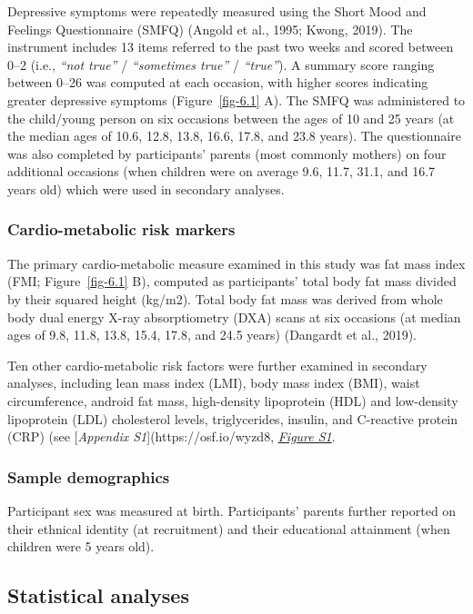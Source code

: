 \documentclass[
  letterpaper,
  DIV=11,
  numbers=noendperiod]{scrreport}
\begin{document}
Depressive symptoms were repeatedly measured using the Short Mood and
Feelings Questionnaire (SMFQ) (Angold et al., 1995; Kwong, 2019). The
instrument includes 13 items referred to the past two weeks and scored
between 0--2 (i.e., \emph{``not true''} / \emph{``sometimes true''} /
\emph{``true''}). A summary score ranging between 0--26 was computed at
each occasion, with higher scores indicating greater depressive symptoms
(Figure~\ref{fig-6.1} A). The SMFQ was administered to the child/young
person on six occasions between the ages of 10 and 25 years (at the
median ages of 10.6, 12.8, 13.8, 16.6, 17.8, and 23.8 years). The
questionnaire was also completed by participants' parents (most commonly
mothers) on four additional occasions (when children were on average
9.6, 11.7, 31.1, and 16.7 years old) which were used in secondary
analyses.

\subsubsection{Cardio-metabolic risk
markers}\label{cardio-metabolic-risk-markers}

The primary cardio-metabolic measure examined in this study was fat mass
index (FMI; Figure~\ref{fig-6.1} B), computed as participants' total
body fat mass divided by their squared height (kg/m2). Total body fat
mass was derived from whole body dual energy X-ray absorptiometry (DXA)
scans at six occasions (at median ages of 9.8, 11.8, 13.8, 15.4, 17.8,
and 24.5 years) (Dangardt et al., 2019).

Ten other cardio-metabolic risk factors were further examined in
secondary analyses, including lean mass index (LMI), body mass index
(BMI), waist circumference, android fat mass, high-density lipoprotein
(HDL) and low-density lipoprotein (LDL) cholesterol levels,
triglycerides, insulin, and C-reactive protein (CRP) (see
{[}\emph{Appendix S1}{]}(https://osf.io/wyzd8,
\href{https://osf.io/wyzd8}{\emph{Figure S1}}.

\subsubsection{Sample demographics}\label{sample-demographics}

Participant sex was measured at birth. Participants' parents further
reported on their ethnical identity (at recruitment) and their
educational attainment (when children were 5 years old).

\subsection{Statistical analyses}\label{statistical-analyses}
\end{document}
